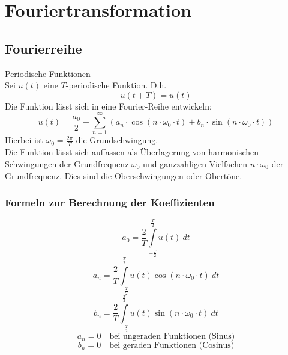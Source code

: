 



\chapter{Fouriertransformation}


\section{Fourierreihe}
Periodische Funktionen\\
Sei $u(t)$ eine $T$-periodische Funktion. D.h. 
\[ u(t + T) = u(t) \]
Die Funktion lässt sich in eine Fourier-Reihe entwickeln: 
\[ u(t) = \frac{a_0}{2} + \sum\limits_{n = 1}^{\infty} 
(a_n \cdot \cos(n \cdot \omega_0 \cdot t) 
+ b_n \cdot \sin(n \cdot \omega_0 \cdot t)) \]
Hierbei ist $\omega_0 = \frac{2 \pi}{T}$ die Grundschwingung. \\
Die Funktion lässt sich auffassen als Überlagerung von harmonischen 
Schwingungen der Grundfrequenz $\omega_0$ und ganzzahligen Vielfachen 
$n \cdot \omega_0$ der Grundfrequenz. Dies sind die Oberschwingungen oder 
Obertöne. \\

\subsection{Formeln zur Berechnung der Koeffizienten}
\[ a_0 = \frac{2}{T} \int\limits_{-\frac{T}{2}}^{\frac{T}{2}} u(t) ~ dt \]
\[ a_n = \frac{2}{T} \int\limits_{-\frac{T}{2}}^{\frac{T}{2}} u(t) 
\cos(n \cdot \omega_0 \cdot t) ~ dt \]
\[ b_n = \frac{2}{T} \int\limits_{-\frac{T}{2}}^{\frac{T}{2}} u(t) 
\sin(n \cdot \omega_0 \cdot t) ~ dt \]
\[ a_n = 0 \quad \text{bei ungeraden Funktionen (Sinus)}\]
\[ b_n = 0 \quad \text{bei geraden Funktionen (Cosinus)}\]

